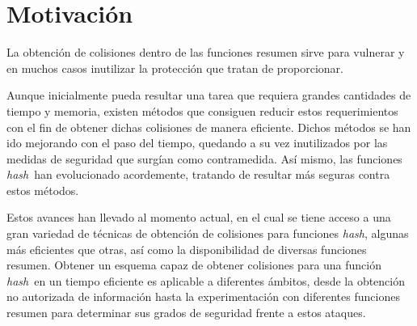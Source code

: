 \documentclass[12pt,spanish,listoffigures,listoftables,listofalgorithms]{tfgetsinf}
\newcommand{\hash}{\textit{hash}}
\begin{document}
\section{Motivaci\'on}

%
%

La obtención de colisiones dentro de las funciones resumen sirve para vulnerar y en muchos casos inutilizar la protección que tratan de proporcionar.

Aunque inicialmente pueda resultar una tarea que requiera grandes cantidades de tiempo y memoria, existen métodos que consiguen reducir estos requerimientos con el fin de obtener dichas colisiones de manera eficiente. Dichos métodos se han ido mejorando con el paso del tiempo, quedando a su vez inutilizados por las medidas de seguridad que surgían como contramedida. Así mismo, las funciones \hash~han evolucionado acordemente, tratando de resultar más seguras contra estos métodos.

Estos avances han llevado al momento actual, en el cual se tiene acceso a una gran variedad de técnicas de obtención de colisiones para funciones \hash, algunas más eficientes que otras, así como la disponibilidad de diversas funciones resumen. Obtener un esquema capaz de obtener colisiones para una función \hash~en un tiempo eficiente es aplicable a diferentes ámbitos, desde la obtención no autorizada de información hasta la experimentación con diferentes funciones resumen para determinar sus grados de seguridad frente a estos ataques.
\end{document}

